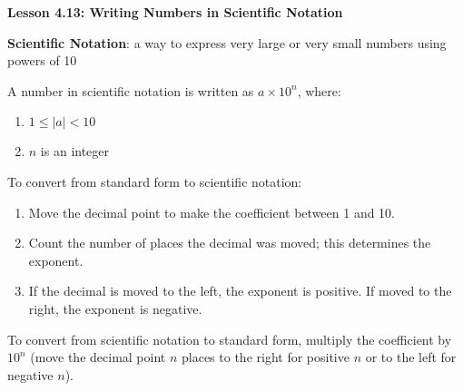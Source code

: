 \begin{center}
\textbf{Lesson 4.13: Writing Numbers in Scientific Notation}
\end{center}

\vspace*{-1.5ex}

\noindent \textbf{ Scientific Notation}: a way to express very large or very small numbers using powers of 10

 \noindent A number in scientific notation is written as \( a \times 10^n \), where:  
    \begin{enumerate}
        \item \( 1 \leq |a| < 10 \) 
        \item \( n \) is an integer 
    \end{enumerate}

\noindent To convert from standard form to scientific notation:
    \begin{enumerate}
        \item Move the decimal point to make the coefficient between 1 and 10.  
        \item Count the number of places the decimal was moved; this determines the exponent.  
        \item If the decimal is moved to the left, the exponent is positive. If moved to the right, the exponent is negative.  
    \end{enumerate}

\noindent To convert from scientific notation to standard form, multiply the coefficient by \( 10^n \) (move the decimal point \( n \) places to the right for positive \( n \) or to the left for negative \( n \)).  
 

